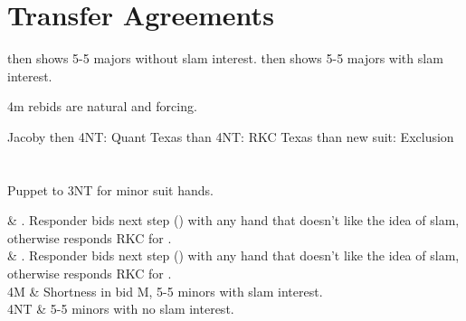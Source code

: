 \documentclass[tom-ari]{subfile}
\begin{document}
\section{Transfer Agreements}

 then  shows 5-5 majors without slam interest.
 then  shows 5-5 majors with slam interest.

4m rebids are natural and forcing.

Jacoby then 4NT:  Quant
Texas than 4NT:  RKC
Texas than new suit: Exclusion

\section[3S]{}

Puppet to 3NT for minor suit hands.

\begin{bidtable}{}
	 & \diamondsuit. Responder bids next step () with any hand that doesn't like the idea of slam, otherwise responds RKC for \diamondsuit. \\
	 & \clubsuit. Responder bids next step () with any hand that doesn't like the idea of slam, otherwise responds RKC for \clubsuit. \\
	4M & Shortness in bid M, 5-5 minors with slam interest. \\
	4NT & 5-5 minors with no slam interest. \\
\end{bidtable}
\end{document}
